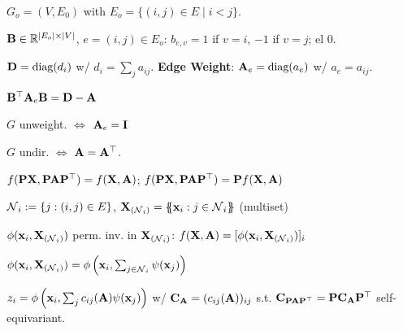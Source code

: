 \begin{definition}
    \(G_o = (V, E_0)\) with \(E_o = \{(i, j) \in E \mid i < j\}\).
\end{definition}

\begin{definition}[Incidence]
    \(\vb{B} \in \mathbb{R}^{|E_o| \times |V|}\), \(e = (i, j) \in E_o\): \(b_{e, v} = 1\) if \(v = i\), \(-1\) if \(v = j\); el \(0\).
\end{definition}

\begin{definition}[Deg]
    \(\vb{D} = \text{diag}(d_i)\) w/ \(d_i = \sum_j a_{ij}\).
    \textbf{Edge Weight}:
    \(\vb{A}_e = \text{diag}(a_e)\) w/ \(a_e = a_{ij}\).
\end{definition}

\begin{lemma}
    \begin{itemize*}
        \item \(\vb{B}^\top \vb{A}_e \vb{B} = \vb{D} - \vb{A}\)
        \item \(G\) {\color{H1}unweight}. \(\iff\) \(\vb{A}_e = \vb{I}\)
        \item \(G\) undir. \(\iff\) \(\vb{A} = \vb{A}^\top\).
    \end{itemize*}
\end{lemma}

\begin{definition}
    \(f(\vb{P}\vb{X}, \vb{P}\vb{A}\vb{P}^\top) = f(\vb{X}, \vb{A})\);
    \(f(\vb{P}\vb{X}, \vb{P}\vb{A}\vb{P}^\top) = \vb{P} f(\vb{X}, \vb{A})\)
\end{definition}

\begin{definition}[Neighborhood]
    \(\operatorname{\mathcal{N}}_i := \{j : (i, j) \in E\}\), \(\vb{X}_{(\operatorname{\mathcal{N}}_i)} = \{\!\!\{\vb{x}_i: j \in \operatorname{\mathcal{N}}_i\}\!\!\}\) (multiset)
\end{definition}

\begin{definition}[Layer]
    \(\phi(\vb{x}_i, \vb{X}_{(\operatorname{\mathcal{N}}_i)})\) perm. inv. in \(\vb{X}_{(\operatorname{\mathcal{N}}_i)}\): \(f(\vb{X}, \vb{A}) = [\phi(\vb{x}_i, \vb{X}_{(\operatorname{\mathcal{N}}_i)})]_i\)
\end{definition}

\begin{definition}
    \(\phi(\vb{x}_i, \vb{X}_{(\operatorname{\mathcal{N}}_i)}) = \phi\left(\vb{x}_i, \sum_{j \in \operatorname{\mathcal{N}}_i} \psi(\vb{x}_j)\right)\)
\end{definition}

\begin{definition}
    \(z_i = \phi\left(\vb{x}_i, \sum_j c_{ij}(\vb{A}) \psi(\vb{x}_j)\right)\) w/ \(\vb{C}_{\vb{A}} = (c_{ij}(\vb{A}))_{ij}\) s.t.
    \(\vb{C}_{\vb{P} \vb{A} \vb{P}^\top} = \vb{P} \vb{C}_{\vb{A}} \vb{P}^\top\) self-equivariant.
\end{definition}

